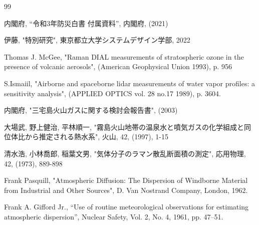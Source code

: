 %
%
%

\begin{thebibliography}{99}

    内閣府, ``令和3年防災白書 付属資料'', 内閣府, (2021)

     伊藤, "特別研究", 東京都立大学システムデザイン学部, 2022
    
     Thomas J. McGee,  "Raman DIAL measurements of stratospheric ozone in the presence of volcanic aerosols", (American Geophysical Union 1993), p. 956
    
     S.Ismaiil, "Airborne and spaceborne lidar measurements of water vapor profiles: a sensitivity analysis", (APPLIED OPTICS vol. 28 no.17 1989), p. 3604.
    
     内閣府, "三宅島火山ガスに関する検討会報告書", (2003)
    
    大場武, 野上健治, 平林順一, "霧島火山地帯の温泉水と噴気ガスの化学組成と同位体比から推定される熱水系", 火山, 42, (1997), 1-15
    
     清水浩, 小林喬郎, 稲葉文男, "気体分子のラマン散乱断面積の測定", 応用物理, 42, (1973), 889-898
    
     Frank Pasquill, "Atmospheric Diffusion: The Dispersion of Windborne Material from Industrial and Other Sources", D. Van Nostrand Company, London, 1962.
    
     Frank A. Gifford Jr., “Use of routine meteorological observations for estimating atmospheric dispersion”, Nuclear Safety, Vol. 2, No. 4, 1961, pp. 47–51.

\end{thebibliography}
